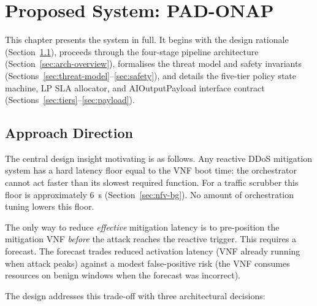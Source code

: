 \chapter{Proposed System: PAD-ONAP}
\label{ch:system}

This chapter presents the \padonap{} system in full. It begins with the
design rationale (Section~\ref{sec:approach}), proceeds through the
four-stage pipeline architecture (Section~\ref{sec:arch-overview}),
formalises the threat model and safety invariants
(Sections~\ref{sec:threat-model}--\ref{sec:safety}), and details the
five-tier policy state machine, LP SLA allocator, and AIOutputPayload
interface contract (Sections~\ref{sec:tiers}--\ref{sec:payload}).

\section{Approach Direction}
\label{sec:approach}

The central design insight motivating \padonap{} is as follows.
Any reactive DDoS mitigation system has a hard latency floor equal to
the VNF boot time: the orchestrator cannot act faster than its slowest
required function. For a traffic scrubber this floor is approximately
6~s (Section~\ref{sec:nfv-bg}). No amount of orchestration tuning lowers
this floor.

The only way to reduce \emph{effective} mitigation latency is to
pre-position the mitigation VNF \emph{before} the attack reaches the
reactive trigger. This requires a forecast. The forecast trades reduced
activation latency (VNF already running when attack peaks) against a
modest false-positive risk (the VNF consumes resources on benign windows
when the forecast was incorrect).

The \padonap{} design addresses this trade-off with three architectural
decisions:

